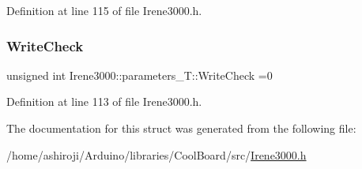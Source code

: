 Definition at line 115 of file Irene3000.\+h.

\mbox{\label{struct_irene3000_1_1parameters___t_a56f1f14d33a69300d580eda2dc52cecd}} 
\subsubsection{\texorpdfstring{Write\+Check}{WriteCheck}}
{\footnotesize\ttfamily unsigned int Irene3000\+::parameters\+\_\+\+T\+::\+Write\+Check =0}



Definition at line 113 of file Irene3000.\+h.



The documentation for this struct was generated from the following file\+:\begin{DoxyCompactItemize}
\item 
/home/ashiroji/\+Arduino/libraries/\+Cool\+Board/src/\hyperlink{_irene3000_8h}{Irene3000.\+h}\end{DoxyCompactItemize}

